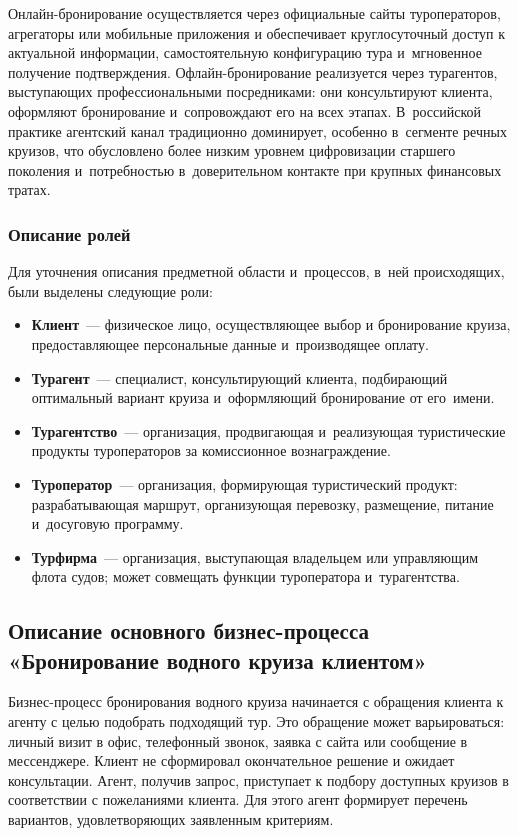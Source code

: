 \documentclass[11pt,a4paper,final]{article}
\begin{document}
	Онлайн-бронирование осуществляется через официальные сайты туроператоров,
	агрегаторы или мобильные приложения и обеспечивает круглосуточный доступ к
	актуальной информации, самостоятельную конфигурацию тура и~мгновенное
	получение подтверждения. Офлайн-бронирование реализуется через турагентов,
	выступающих профессиональными посредниками: они консультируют клиента,
	оформляют бронирование и~сопровождают его на всех этапах. В~российской
	практике агентский канал традиционно доминирует, особенно в~сегменте речных
	круизов, что обусловлено более низким уровнем цифровизации старшего поколения
	и~потребностью в~доверительном контакте при крупных финансовых тратах.
	
	\subsubsection*{Описание ролей}
	
	Для уточнения описания предметной области и~процессов, в~ней происходящих,
	были выделены следующие роли:
	
	\begin{itemize}[leftmargin=2em]
		\item \textbf{Клиент}~--- физическое лицо, осуществляющее выбор и
		бронирование круиза, предоставляющее персональные данные и~производящее
		оплату.
		\item \textbf{Турагент}~--- специалист, консультирующий клиента,
		подбирающий оптимальный вариант круиза и~оформляющий бронирование от
		его~имени.
		\item \textbf{Турагентство}~--- организация, продвигающая и~реализующая
		туристические продукты туроператоров за комиссионное вознаграждение.
		\item \textbf{Туроператор}~--- организация, формирующая туристический
		продукт: разрабатывающая маршрут, организующая перевозку, размещение,
		питание и~досуговую программу.
		\item \textbf{Турфирма}~--- организация, выступающая владельцем или
		управляющим флота судов; может совмещать функции туроператора
		и~турагентства.
	\end{itemize}
	
	
	\newpage
	\subsection{Описание основного бизнес-процесса «Бронирование водного круиза клиентом»}
	

Бизнес-процесс бронирования водного круиза начинается с обращения клиента к агенту с целью подобрать подходящий тур. Это обращение может варьироваться: личный визит в офис, телефонный звонок, заявка с сайта или сообщение в мессенджере. Клиент не сформировал окончательное решение и ожидает консультации. Агент, получив запрос, приступает к подбору доступных круизов в соответствии с пожеланиями клиента. Для этого агент формирует перечень вариантов, удовлетворяющих заявленным критериям.
\end{document}
